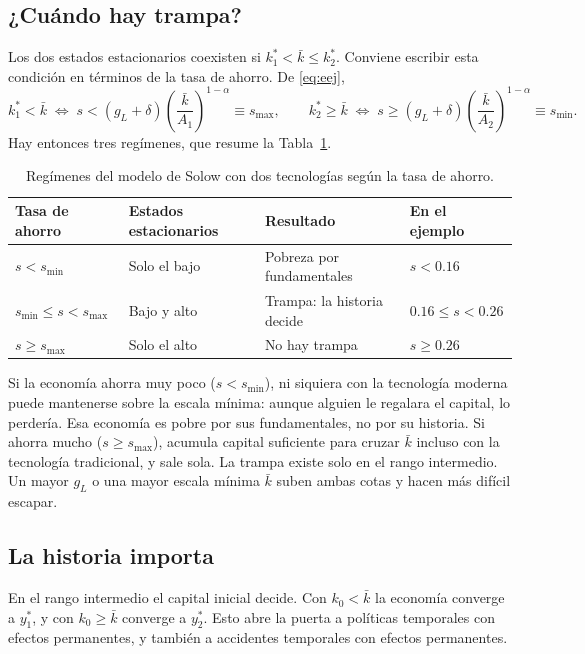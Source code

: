 \documentclass[12pt,letterpaper]{article}
\begin{document}
\subsection{¿Cuándo hay trampa?}

Los dos estados estacionarios coexisten si $k_1^*<\bar k\leq k_2^*$. Conviene escribir esta condición en términos de la tasa de ahorro. De \eqref{eq:eej},
\[
  k_1^*<\bar k\;\Longleftrightarrow\;s<(g_L+\delta)\left(\frac{\bar k}{A_1}\right)^{1-\alpha}\equiv s_{\max},
  \qquad
  k_2^*\geq\bar k\;\Longleftrightarrow\;s\geq(g_L+\delta)\left(\frac{\bar k}{A_2}\right)^{1-\alpha}\equiv s_{\min}.
\]
Hay entonces tres regímenes, que resume la Tabla~\ref{tab:reg}.

\begin{table}[htb]
\centering
\begin{tabular}{@{}llll@{}}
\toprule
Tasa de ahorro & Estados estacionarios & Resultado & En el ejemplo \\
\midrule
$s<s_{\min}$ & Solo el bajo & Pobreza por fundamentales & $s<0.16$ \\
$s_{\min}\leq s<s_{\max}$ & Bajo y alto & Trampa: la historia decide & $0.16\leq s<0.26$ \\
$s\geq s_{\max}$ & Solo el alto & No hay trampa & $s\geq0.26$ \\
\bottomrule
\end{tabular}
\caption{Regímenes del modelo de Solow con dos tecnologías según la tasa de ahorro.}
\label{tab:reg}
\end{table}

Si la economía ahorra muy poco ($s<s_{\min}$), ni siquiera con la tecnología moderna puede mantenerse sobre la escala mínima: aunque alguien le regalara el capital, lo perdería. Esa economía es pobre por sus fundamentales, no por su historia. Si ahorra mucho ($s\geq s_{\max}$), acumula capital suficiente para cruzar $\bar k$ incluso con la tecnología tradicional, y sale sola. La trampa existe solo en el rango intermedio. Un mayor $g_L$ o una mayor escala mínima $\bar k$ suben ambas cotas y hacen más difícil escapar.

\subsection{La historia importa}

En el rango intermedio el capital inicial decide. Con $k_0<\bar k$ la economía converge a $y_1^*$, y con $k_0\geq\bar k$ converge a $y_2^*$. Esto abre la puerta a políticas temporales con efectos permanentes, y también a accidentes temporales con efectos permanentes.
\end{document}
